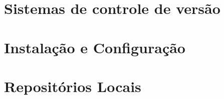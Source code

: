 \documentclass[
  a5paper,
  pagesize,
  9pt,
  pointlessnumbers,
  normalheadings,
  twoside=false
]{book}
\begin{document}
\newpage



\hypersetup{linkcolor=black}
\setcounter{tocdepth}{2}
\tableofcontents


\chapter{Sistemas de controle de versão}


\chapter{Instalação e Configuração}


\chapter{Repositórios Locais}


% 
% 
% 
% 
% 
% 
\end{document}
